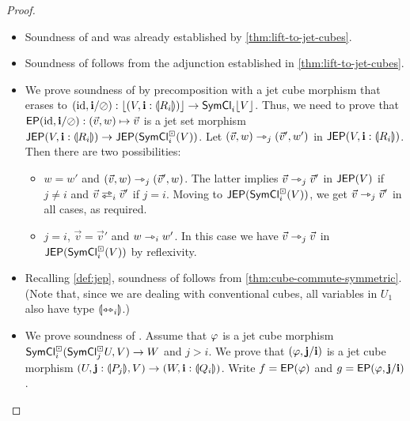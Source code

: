 \documentclass[a4paper]{memoir}
\begin{document}
\begin{proof}
\begin{itemize}
		\item Soundness of  and  was already established by \cref{thm:lift-to-jet-cubes}.
		
		\item Soundness of  follows from the adjunction established in \cref{thm:lift-to-jet-cubes}.
		
		\item We prove soundness of  by precomposition with a jet cube morphism that erases to $(\mathrm{id}, \mathbf{i} / \oslash) : \mathopen{}\left\lfloor (V, \mathbf{i} : {\llparenthesis R_i \rrparenthesis}) \right\rfloor\mathclose{} \to \mathsf{SymCl}_i \mathopen{}\left\lfloor V \right\rfloor\mathclose{}$.
		Thus, we need to prove that $\mathsf{EP}(\mathrm{id}, \mathbf{i} / \oslash) : (\vec v, w) \mapsto \vec v$ is a jet set morphism $\mathsf{JEP}(V, \mathbf{i} : {\llparenthesis R_i \rrparenthesis})
		\to \mathsf{JEP}(\mathsf{SymCl}^\boxdot_i(V))$.
		Let $(\vec v, w) \rightarrowtriangle_j (\vec v', w')$ in $\mathsf{JEP}(V, \mathbf{i} : {\llparenthesis R_i \rrparenthesis})$.
		Then there are two possibilities:
		\begin{itemize}
			\item $w = w'$ and $(\vec v, w) \rightarrowtriangle_j (\vec v', w)$. The latter implies $\vec v \rightarrowtriangle_j \vec v'$ in $\mathsf{JEP}(V)$ if $j \neq i$ and $\vec v \infrajet_i \vec v'$ if $j = i$. Moving to $\mathsf{JEP}(\mathsf{SymCl}^\boxdot_i(V))$, we get $\vec v \rightarrowtriangle_j \vec v'$ in all cases, as required.
			\item $j = i$, $\vec v = \vec v'$ and $w \rightarrowtriangle_i w'$. In this case we have $\vec v \rightarrowtriangle_j \vec v$ in $\mathsf{JEP}(\mathsf{SymCl}^\boxdot_i(V))$ by reflexivity.
		\end{itemize}
		
		\item Recalling \cref{def:jep}, soundness of  follows from \cref{thm:cube-commute-symmetric}.
		(Note that, since we are dealing with conventional cubes, all variables in $U_1$ also have type ${\llparenthesis \leftrightarrowtriangle_i \rrparenthesis}$.)
		
		\item We prove soundness of .
		Assume that $\varphi$ is a jet cube morphism $\mathsf{SymCl}^\boxdot_i(\mathsf{SymCl}^\boxdot_j U, V) \to W$ and $j > i$.
		We prove that $(\varphi, \mathbf{j} / \mathbf{i})$ is a jet cube morphism $(U, \mathbf{j} : {\llparenthesis P_j \rrparenthesis}, V) \to (W, \mathbf{i} : {\llparenthesis Q_i \rrparenthesis})$.
		Write $f = \mathsf{EP}(\varphi)$ and $g = \mathsf{EP}(\varphi, \mathbf{j} / \mathbf{i})$.
		

\end{itemize}
\end{proof}
\end{document}
